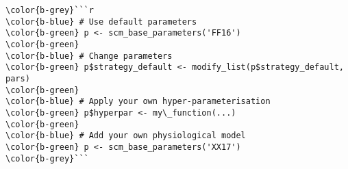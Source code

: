 \documentclass[class=minimal,border=0]{standalone}
\begin{document}
%
\begin{BVerbatim}
\color{b-grey}```r
\color{b-blue} # Use default parameters
\color{b-green} p <- scm_base_parameters('FF16')
\color{b-green}
\color{b-blue} # Change parameters
\color{b-green} p$strategy_default <- modify_list(p$strategy_default, pars)
\color{b-green}
\color{b-blue} # Apply your own hyper-parameterisation
\color{b-green} p$hyperpar <- my\_function(...)
\color{b-green}
\color{b-blue} # Add your own physiological model
\color{b-green} p <- scm_base_parameters('XX17')
\color{b-grey}```
\end{BVerbatim}
\end{document}
